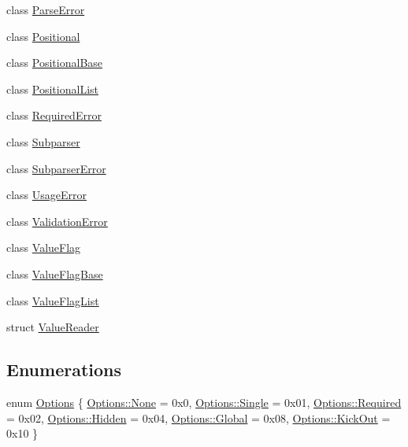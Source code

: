 \begin{DoxyCompactItemize}
\item 
class \hyperlink{classargs_1_1_parse_error}{Parse\+Error}
\item 
class \hyperlink{classargs_1_1_positional}{Positional}
\item 
class \hyperlink{classargs_1_1_positional_base}{Positional\+Base}
\item 
class \hyperlink{classargs_1_1_positional_list}{Positional\+List}
\item 
class \hyperlink{classargs_1_1_required_error}{Required\+Error}
\item 
class \hyperlink{classargs_1_1_subparser}{Subparser}
\item 
class \hyperlink{classargs_1_1_subparser_error}{Subparser\+Error}
\item 
class \hyperlink{classargs_1_1_usage_error}{Usage\+Error}
\item 
class \hyperlink{classargs_1_1_validation_error}{Validation\+Error}
\item 
class \hyperlink{classargs_1_1_value_flag}{Value\+Flag}
\item 
class \hyperlink{classargs_1_1_value_flag_base}{Value\+Flag\+Base}
\item 
class \hyperlink{classargs_1_1_value_flag_list}{Value\+Flag\+List}
\item 
struct \hyperlink{structargs_1_1_value_reader}{Value\+Reader}
\end{DoxyCompactItemize}
\subsection*{Enumerations}
\begin{DoxyCompactItemize}
\item 
enum \hyperlink{namespaceargs_aa530c0f95194aa275f49a5f299ac9e77}{Options} \{ \newline
\hyperlink{namespaceargs_aa530c0f95194aa275f49a5f299ac9e77a6adf97f83acf6453d4a6a4b1070f3754}{Options\+::\+None} = 0x0, 
\hyperlink{namespaceargs_aa530c0f95194aa275f49a5f299ac9e77a66ba162102bbf6ae31b522aec561735e}{Options\+::\+Single} = 0x01, 
\hyperlink{namespaceargs_aa530c0f95194aa275f49a5f299ac9e77ab651efdb98a5d6bd2b3935d0c3f4a5e2}{Options\+::\+Required} = 0x02, 
\hyperlink{namespaceargs_aa530c0f95194aa275f49a5f299ac9e77a7acdf85c69cc3c5305456a293524386e}{Options\+::\+Hidden} = 0x04, 
\newline
\hyperlink{namespaceargs_aa530c0f95194aa275f49a5f299ac9e77a4cc6684df7b4a92b1dec6fce3264fac8}{Options\+::\+Global} = 0x08, 
\hyperlink{namespaceargs_aa530c0f95194aa275f49a5f299ac9e77ae7f51a3f145768a266f00392220e780e}{Options\+::\+Kick\+Out} = 0x10
 \}
\end{DoxyCompactItemize}
